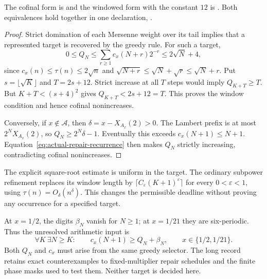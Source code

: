 \documentclass[11pt]{article}
\newcommand{\Ach}{\mathcal A}
\begin{document}
The cofinal form is
\href{https://github.com/wcook04/plectis-erdos/blob/f36a98bf3d3e6f65f1074e3b800e3293d5b8a51a/ErdosProblems/Erdos257/GreedyRepairCriterion.lean#L175}{}
and the windowed form with the constant $12$ is
\href{https://github.com/wcook04/plectis-erdos/blob/f36a98bf3d3e6f65f1074e3b800e3293d5b8a51a/ErdosProblems/Erdos257/GreedyRepairCriterion.lean#L192}{}.
Both equivalences hold together in one declaration,
\href{https://github.com/wcook04/plectis-erdos/blob/f36a98bf3d3e6f65f1074e3b800e3293d5b8a51a/ErdosProblems/Erdos257/PaperCompleteR7/Assemblies.lean#L40}{}.

\begin{proof}
Strict domination of each Mersenne weight over its tail implies that a
represented target is recovered by the greedy rule.  For such a target,
\[
 0\le Q_N\le\sum_{r\ge1}c_x(N+r)2^{-r}
 \le2\sqrt N+4,
\]
since $c_x(n)\le\tau(n)\le2\sqrt n$ and
$\sqrt{N+r}\le\sqrt N+\sqrt r\le\sqrt N+r$.
Put $s=\lfloor\sqrt K\rfloor$ and $T=2s+12$.
Strict increase at all $T$ steps would imply $Q_{K+T}\ge T$.
But $K+T<(s+4)^2$ gives $Q_{K+T}<2s+12=T$.
This proves the window condition and hence cofinal nonincreases.

Conversely, if $x\notin\Ach$, then
$\delta=x-X_{A_x}(2)>0$.  The Lambert prefix is at most
$2^NX_{A_x}(2)$, so $Q_N\ge2^N\delta-1$.
Eventually this exceeds $c_x(N+1)\le N+1$.
Equation~\eqref{eq:actual-repair-recurrence} then makes $Q_N$ strictly
increasing, contradicting cofinal nonincreases.
\end{proof}

The explicit square-root estimate is uniform in the target.  The ordinary
subpower refinement replaces its window length by
$\lceil C_\varepsilon(K+1)^\varepsilon\rceil$ for every
$0<\varepsilon<1$, using $\tau(n)=O_\delta(n^\delta)$.
This changes the permissible deadline without proving any occurrence
for a specified target.

At $x=1/2$, the digits $\beta_N$ vanish for $N\ge1$; at $x=1/21$ they
are six-periodic.  Thus the unresolved arithmetic input is
\begin{equation}
 \boxed{\quad
 \forall K\ \exists N\ge K:\qquad
 c_x(N+1)\ge Q_N+\beta_N,
 \qquad x\in\{1/2,1/21\}.
 \quad}\label{eq:actual-selector-obligation}
\end{equation}
Both $Q_N$ and $c_x$ must arise from the same greedy selector.
The long record retains exact counterexamples to fixed-multiplier repair
schedules and the finite phase masks used to test them.
Neither target is decided here.
\end{document}
